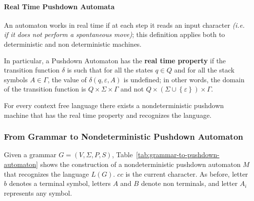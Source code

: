 \documentclass[english]{article}
\begin{document}
\paragraph{Real Time Pushdown Automata}

An automaton works in real time if at each step it reads an input character \textit{(i.e. if it does not perform a spontaneous move)};
this definition applies both to deterministic and non deterministic machines.

In particular, a Pushdown Automaton has the \textbf{real time property} if the transition function \(\delta\) is such that for all the states \(q \in Q\) and for all the stack symbols \(A \in \Gamma\), the value of \(\delta(q, \varepsilon, A)\) is undefined;
in other words, the domain of the transition function is \(Q \times \Sigma \times \Gamma\) and not \(Q \times \left( \Sigma \cup \left\{ \varepsilon \right\} \right) \times \Gamma\).

For every context free language there exists a nondeterministic pushdown machine that has the real time property and recognizes the language.

\subsubsection{From Grammar to Nondeterministic Pushdown Automaton}

Given a grammar \(G = \left( V, \Sigma, P, S \right)\), Table~\ref{tab:grammar-to-pushdown-automaton} shows the construction of a nondeterministic pushdown automaton \(M\) that recognizes the language \(L(G)\). \(cc\) is the current character.
As before, letter \(b\) denotes a terminal symbol, letters \(A\) and \(B\) denote non terminals, and letter \(A_i\) represents any symbol.
\end{document}
